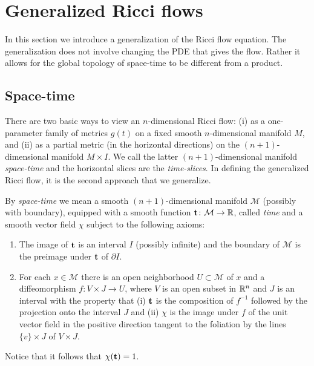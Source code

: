 \section{Generalized Ricci flows}

In this section we introduce a generalization of the Ricci flow
equation. The generalization does not involve changing the PDE that
gives the flow. Rather it allows for the global topology of
space-time to be different from a product.
\subsection{Space-time}

There are two basic ways to view an $n$-dimensional Ricci flow: (i)
as a one-parameter family of metrics $g(t)$ on a fixed smooth
$n$-dimensional manifold $M$, and (ii) as a partial metric (in the
horizontal directions) on the $(n+1)$-dimensional manifold $M\times
I$. We call the latter $(n+1)$-dimensional manifold {\sl
space-time} and the
horizontal slices are the {\em time-slices}. In defining the
generalized Ricci flow, it is the second approach that we
generalize.

\begin{definition}\label{def:generalized-spacetime}


By {\em space-time} we mean a smooth $(n+1)$-dimensional manifold
${\mathcal M}$ (possibly with boundary), equipped with a smooth
function ${\bf t}\colon {\mathcal M}\to \mathbb{R}$, called {\em time} and
a smooth vector field $\chi$ subject to the following axioms:
\begin{enumerate}
\item The image of ${\bf t}$ is an interval $I$ (possibly infinite) and
the boundary of ${\mathcal M}$ is the preimage under ${\bf t}$ of
$\partial I$.
\item For each $x\in {\mathcal M}$ there is an open neighborhood $U\subset
{\mathcal M}$ of $x$ and a diffeomorphism $f\colon  V\times J\to U$,
where $V$ is an open subset in $\mathbb{R} ^n$ and $J$ is an interval with
the property that (i) ${\bf t}$ is the composition of $f^{-1}$
followed by the projection onto the interval $J$ and (ii) $\chi$ is
the image under $f$ of the unit vector field in the positive
direction tangent to the foliation by the lines $\{v\}\times J$ of
$V\times J$.
\end{enumerate}
\end{definition}

 Notice that it follows
that $\chi({\bf t})=1$.




